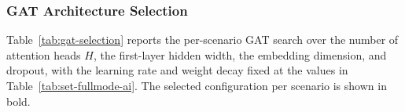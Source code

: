 \documentclass[12pt, a4paper]{report}
\begin{document}
\subsubsection{GAT Architecture Selection}

Table~\ref{tab:gat-selection} reports the per-scenario GAT search over the number
of attention heads $H$, the first-layer hidden width, the embedding dimension,
and dropout, with the learning rate and weight decay fixed at the values in
Table~\ref{tab:set-fullmode-ai}. The selected configuration per scenario is shown
in bold.

\begin{table}[H]
\centering
\caption{Full-mode GAT model selection by validation MCC (Eq.~\ref{eq:mcc}),
mean~$\pm$~std over $\geq 3$ seeds. Selected configuration per scenario in bold.}
\label{tab:gat-selection}
\renewcommand{\arraystretch}{1.2}
\end{table}
\end{document}
